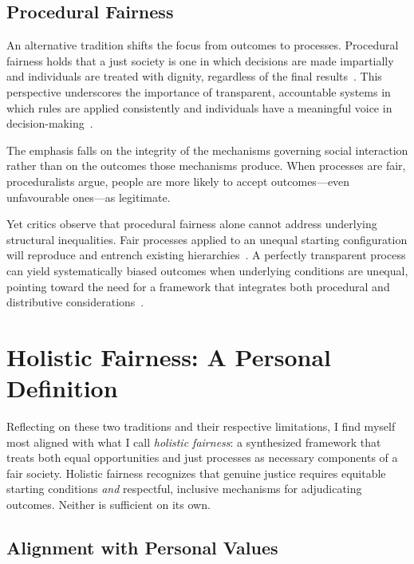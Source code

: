 \documentclass[11pt,showkeys]{../../shared/essay}
\begin{document}
\subsection{Procedural Fairness}

An alternative tradition shifts the focus from outcomes to processes. Procedural fairness holds
that a just society is one in which decisions are made impartially and individuals are treated
with dignity, regardless of the final results~\cite{dahlstrom,basic_procedural}. This
perspective underscores the importance of transparent, accountable systems in which rules are
applied consistently and individuals have a meaningful voice in decision-making~\cite{canada2017}.

The emphasis falls on the integrity of the mechanisms governing social interaction rather than
on the outcomes those mechanisms produce. When processes are fair, proceduralists argue,
people are more likely to accept outcomes---even unfavourable ones---as legitimate.

Yet critics observe that procedural fairness alone cannot address underlying structural
inequalities. Fair processes applied to an unequal starting configuration will reproduce and
entrench existing hierarchies~\cite{macdonald1980,galligan1997}. A perfectly transparent
process can yield systematically biased outcomes when underlying conditions are unequal,
pointing toward the need for a framework that integrates both procedural and distributive
considerations~\cite{ferguson2013,rescher2003,morse2021}.

\section{Holistic Fairness: A Personal Definition}

Reflecting on these two traditions and their respective limitations, I find myself most aligned
with what I call \textit{holistic fairness}: a synthesized framework that treats both equal
opportunities and just processes as necessary components of a fair society. Holistic fairness
recognizes that genuine justice requires equitable starting conditions \textit{and} respectful,
inclusive mechanisms for adjudicating outcomes. Neither is sufficient on its own.

\subsection{Alignment with Personal Values}
\end{document}
